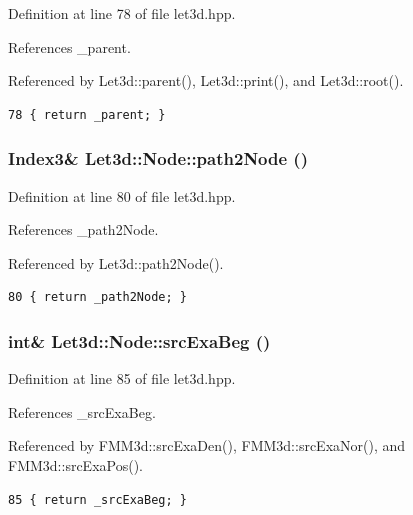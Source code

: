 Definition at line 78 of file let3d.hpp.

References \_\-parent.

Referenced by Let3d::parent(), Let3d::print(), and Let3d::root().

\footnotesize\begin{verbatim}78 { return _parent; }
\end{verbatim}\normalsize 


\subsubsection{\setlength{\rightskip}{0pt plus 5cm}Index3\& Let3d::Node::path2Node ()\hspace{0.3cm}{\tt  [inline]}}\label{classLet3d_1_1Node_9b575f3d0d503ffeef3682a04f373c35_9b575f3d0d503ffeef3682a04f373c35}




Definition at line 80 of file let3d.hpp.

References \_\-path2Node.

Referenced by Let3d::path2Node().

\footnotesize\begin{verbatim}80 { return _path2Node; }
\end{verbatim}\normalsize 


\subsubsection{\setlength{\rightskip}{0pt plus 5cm}int\& Let3d::Node::src\-Exa\-Beg ()\hspace{0.3cm}{\tt  [inline]}}\label{classLet3d_1_1Node_6ebcebacbf54c9e143ab8737cf7ca937_6ebcebacbf54c9e143ab8737cf7ca937}




Definition at line 85 of file let3d.hpp.

References \_\-src\-Exa\-Beg.

Referenced by FMM3d::src\-Exa\-Den(), FMM3d::src\-Exa\-Nor(), and FMM3d::src\-Exa\-Pos().

\footnotesize\begin{verbatim}85 { return _srcExaBeg; }
\end{verbatim}\normalsize 


